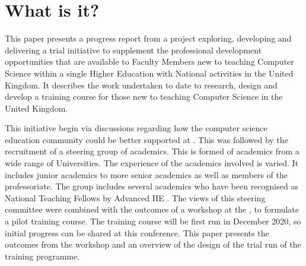 \documentclass[sigconf]{acmart}
\begin{document}


\maketitle


\section{What is it?}	
This paper presents a progress report from a project exploring, developing and delivering a trial initiative to supplement the professional development opportunities that are available to Faculty Members new to teaching Computer Science within a single Higher Education with National activities in the United Kingdom. It describes the work undertaken to date to research, design and develop a training course for those new to teaching Computer Science in the United Kingdom. 

This initiative begin via discussions regarding how the computer science education community could be better supported at  . This was followed by the recruitment of a steering group of academics. This is formed of academics from a wide range of Universities. The experience of the academics involved is varied. It includes junior academics to more senior academics as well as members of the professoriate. The group includes several academics who have been recognised as National Teaching Fellows by Advanced HE \cite{AdvancedHENTF}. The views of this steering committee were combined with the outcomes of a workshop at the  , to formulate a pilot training course. The training course will be first run in December 2020, so initial progress can be shared at this conference. This paper presents the outcomes from the workshop and an overview of the design of the trial run of the training programme.
\end{document}
